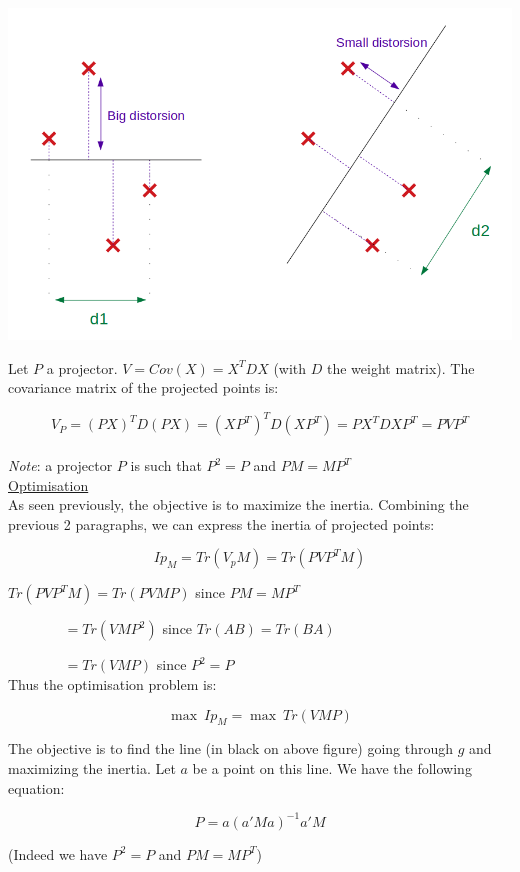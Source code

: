 \begin{center}
\includegraphics[scale=0.4]{PCA_projections.png}
\end{center}

Let $P$ a projector. $V = Cov(X) = X^TDX$ (with $D$ the weight matrix). The covariance matrix of the projected points is:

$$V_P = (PX)^TD(PX) = (XP^T)^TD(XP^T) = PX^TDXP^T = PVP^T$$ \\

\textit{Note}: a projector $P$ is such that $P^2=P$ and $PM = MP^T$ \\

\underline{Optimisation} \\

As seen previously, the objective is to maximize the inertia. Combining the previous 2 paragraphs, we can express the inertia of projected points:

$$Ip_M = Tr(V_pM) = Tr(PVP^TM)$$

$Tr(PVP^TM) = Tr(PVMP)$ since $PM = MP^T$

$~~~~~~~~~~~~~~~~~~= Tr(VMP^2)$ since $Tr(AB) = Tr(BA)$

$~~~~~~~~~~~~~~~~~~= Tr(VMP)$ since $P^2 = P$ \\

Thus the optimisation problem is:

$$\max~Ip_M = \max~Tr(VMP)$$

The objective is to find the line (in black on above figure) going through $g$ and maximizing the inertia. Let $a$ be a point on this line. We have the following equation:

$$P=a(a'Ma)^{-1}a'M$$

(Indeed we have $P^2=P$ and $PM = MP^T$) \\

